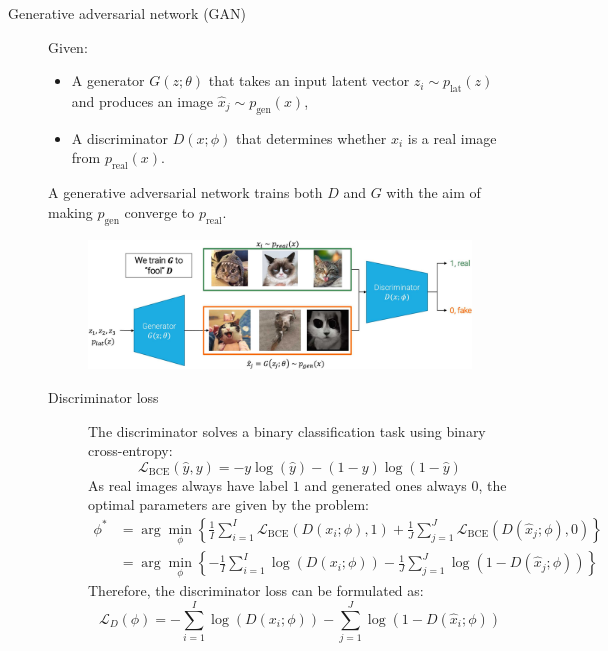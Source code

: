 \begin{description}
    \item[Generative adversarial network (GAN)] 
        Given:
        \begin{itemize}
            \item A generator $G(z; \theta)$ that takes an input latent vector $z_i \sim p_\text{lat}(z)$ and produces an image $\hat{x}_j \sim p_\text{gen}(x)$,
            \item A discriminator $D(x; \phi)$ that determines whether $x_i$ is a real image from $p_\text{real}(x)$.
        \end{itemize}
        A generative adversarial network trains both $D$ and $G$ with the aim of making $p_\text{gen}$ converge to $p_\text{real}$.

        \begin{figure}[H]
            \centering
            \includegraphics[width=0.8\linewidth]{./img/_gan_flow.jpg}
        \end{figure}


        \begin{description}
            \item[Discriminator loss] 
                The discriminator solves a binary classification task using binary cross-entropy:
                \[ \mathcal{L}_\text{BCE}(\hat{y}, y) = -y \log(\hat{y}) - (1-y)\log(1-\hat{y}) \]
                As real images always have label $1$ and generated ones always $0$, the optimal parameters are given by the problem:
                \[ 
                    \begin{split}
                        \phi^* &= \arg\min_{\phi} \left\{ 
                            \frac{1}{I} \sum_{i=1}^I \mathcal{L}_\text{BCE}(D(x_i; \phi), 1) + 
                            \frac{1}{J} \sum_{j=1}^J \mathcal{L}_\text{BCE}(D(\hat{x}_j; \phi), 0) 
                        \right\} \\ 
                        &= \arg\min_{\phi} \left\{ 
                            -\frac{1}{I} \sum_{i=1}^I \log \left( D(x_i; \phi) \right) - 
                            \frac{1}{J} \sum_{j=1}^J \log \left( 1- D(\hat{x}_j; \phi) \right) 
                        \right\}
                    \end{split}
                \]
                Therefore, the discriminator loss can be formulated as:
                \[ \mathcal{L}_D(\phi) = - \sum_{i=1}^{I} \log(D(x_i; \phi)) - \sum_{j=1}^{J} \log(1-D(\hat{x}_i; \phi)) \]


\end{description}
\end{description}

